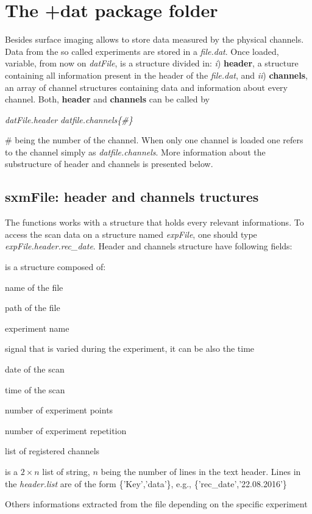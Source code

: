 \section{The +dat package folder}

Besides surface imaging \nanonis{} allows to store data measured by the physical channels. Data from the so called experiments are stored in a \emph{file.dat}.
Once loaded, variable, from now on \emph{datFile}, is a structure divided in: \emph{i}) \textbf{header}, a structure containing all information present in the header of the \emph{file.dat}, and \emph{ii}) \textbf{channels}, an array of channel structures containing data and information about every channel.
Both, \textbf{header} and \textbf{channels} can be called by
\begin{center}
\emph{datFile.header} \quad {} \quad \emph{datfile.channels\{\#\}}
\end{center}
\# being the number of the channel. When only one channel is loaded one refers to the channel simply as \emph{datfile.channels}. 
More information about the substructure of header and channels is presented below.


\subsection{sxmFile: header and channels tructures}
\label{sec:sxmFile}

The functions works with a structure that holds every relevant informations. To access the scan data on a structure named \emph{expFile}, one should type \emph{expFile.header.rec\_date}. Header and channels structure have following fields:

\bdf
\item[header] is a structure composed of:
  \bdf
  \item[file] name of the file
  \item[path] path of the file
  \item[experiment] experiment name
  \item[sweep\_signal] signal that is varied during the experiment, it can be also the time
  \item[rec\_date] date of the scan
  \item[rec\_time] time of the scan
  \item[points] number of experiment points
  \item[grid\_points] number of experiment repetition
  \item[channels] list of registered channels
  \item[list] is a $2 \times n$ list of string, $n$ being the number of lines in the text header. Lines in the \emph{header.list} are of the form \{'Key','data'\}, e.g., \{'rec\_date','22.08.2016'\}
  \item[$\cdots$] Others informations extracted from the file depending on the specific experiment
  \edf

